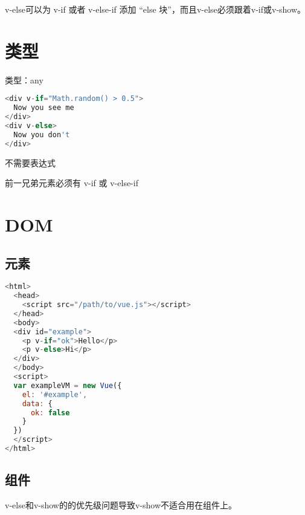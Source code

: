 v-else可以为 v-if 或者 v-else-if 添加 “else 块”，而且v-else必须跟着v-if或v-show。


\section{类型}

\begin{compactitem}
\item 类型：any
\end{compactitem}


\begin{lstlisting}[language=JavaScript]
<div v-if="Math.random() > 0.5">
  Now you see me
</div>
<div v-else>
  Now you don't
</div>
\end{lstlisting}

\begin{compactitem}
\item 不需要表达式
\item 前一兄弟元素必须有 v-if 或 v-else-if
\end{compactitem}


\section{DOM}

\subsection{元素}


\begin{lstlisting}[language=JavaScript]
<html>
  <head>
    <script src="/path/to/vue.js"></script>
  </head>
  <body>
  <div id="example">
    <p v-if="ok">Hello</p>
    <p v-else>Hi</p>
  </div>
  </body>
  <script>
  var exampleVM = new Vue({
    el: '#example',
    data: {
      ok: false
    }
  })
  </script>
</html>
\end{lstlisting}


\subsection{组件}

v-else和v-show的的优先级问题导致v-show不适合用在组件上。

